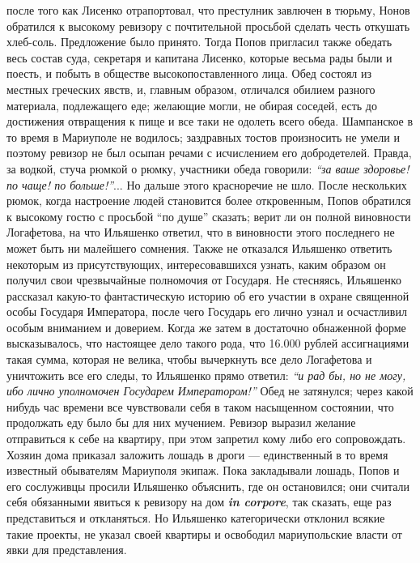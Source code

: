 \documentclass[a4paper,20pt]{report}
\begin{document}
после того как Лисенко отрапортовал, что престулник
завлючен в тюрьму, Нонов обратился к высокому ревизору с почтительной 
просьбой сделать честь откушать хлеб-соль. Предложение было принято. 
Тогда Попов пригласил
также обедать весь состав суда, секретаря и капитана
Лисенко, которые весьма рады были и поесть, и побыть в
обществе высокопоставленного лица. Обед состоял из местных греческих явств, и, главным образом, отличался
обилием разного материала, подлежащего еде; желающие
могли, не обирая соседей, есть до достижения отвращения к
пище и все таки не одолеть всего обеда. Шампанское в
то время в Мариуполе не водилось; заздравных тостов
произносить не умели и поэтому ревизор не был осыпан
речами с исчислением его добродетелей. Правда, за водкой,
стуча рюмкой о рюмку, участники обеда говорили: \emph{``за ваше
здоровье! по чаще! по больше!''}... Но дальше этого красноречие не шло.
После нескольких рюмок, когда настроение людей становится более откровенным, Попов обратился к
высокому гостю с просьбой ``по душе'' сказать; верит ли
он полной виновности Логафетова, на что Ильяшенко ответил, что в виновности этого последнего
не может быть ни малейшего сомнения. Также не отказался Ильяшенко ответить некоторым из 
присутствующих, интересовавшихся узнать, каким образом он получил свои чрезвычайные
полномочия от Государя. Не стесняясь, Ильяшенко рассказал 
какую-то фантастическую историю об его участии в
охране священной особы Государя Императора, после чего
Государь его лично узнал и осчастливил особым вниманием и доверием.
Когда же затем в достаточно обнаженной форме высказывалось, что настоящее дело такого рода,
что 16.000 рублей ассигнациями такая сумма, которая не
велика, чтобы вычеркнуть все дело Логафетова и уничтожить
все его следы, то Ильяшенко прямо ответил: \emph{``и рад бы,
но не могу, ибо лично уполномочен Государем Императором!''} Обед не затянулся; через какой нибудь час
времени все чувствовали себя в таком насыщенном состоянии,
что продолжать еду было бы для них мучением.
Ревизор выразил желание отправиться к себе на квартиру,
при этом запретил кому либо его сопровождать. Хозяин
дома приказал заложить лошадь в дроги — единственный
в то время известный обывателям Мариуполя экипаж.
Пока закладывали лошадь, Попов и его сослуживцы просили Ильяшенко 
объяснить, где он остановился; они считали себя обязанными явиться к ревизору на дом \textbf{\em in corpore},
так сказать, еще раз представиться и откланяться. Но
Ильяшенко категорически отклонил всякие такие проекты,
не указал своей квартиры и освободил мариупольские власти
от явки для представления.
\end{document}
